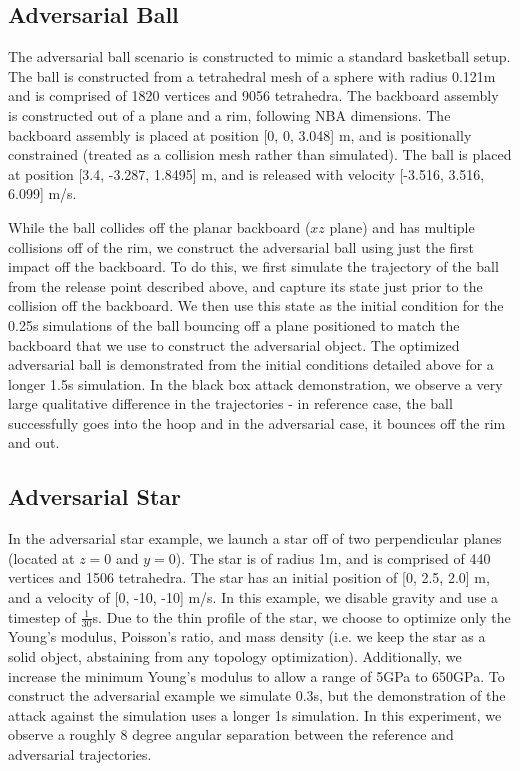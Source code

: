 \subsection{Adversarial Ball}
The adversarial ball scenario is constructed to mimic a standard basketball setup. The ball is constructed from a tetrahedral mesh of a sphere with radius 0.121m and is comprised of 1820 vertices and 9056 tetrahedra. The backboard assembly is constructed out of a plane and a rim, following NBA dimensions. The backboard assembly is placed at position [0, 0, 3.048] m, and is positionally constrained (treated as a collision mesh rather than simulated). The ball is placed at position  [3.4, -3.287, 1.8495] m, and is released with velocity [-3.516,  3.516,  6.099] m/s. 

While the ball collides off the planar backboard ($xz$ plane) and has multiple collisions off of the rim, we construct the adversarial ball using just the first impact off the backboard. To do this, we first simulate the trajectory of the ball from the release point described above, and capture its state just prior to the collision off the backboard. We then use this state as the initial condition for  the 0.25s simulations of the ball bouncing off a plane positioned to match the backboard that we use to construct the adversarial object. The optimized adversarial ball is demonstrated from the initial conditions detailed above for a longer 1.5s simulation. In the black box attack demonstration, we observe a very large qualitative difference in the trajectories - in reference case, the ball successfully goes into the hoop and in the adversarial case, it bounces off the rim and out.

\subsection{Adversarial Star}
In the adversarial star example, we launch a star off of two perpendicular planes (located at $z = 0$ and $y = 0$). The star is of radius 1m, and is comprised of 440 vertices and 1506 tetrahedra. The star has an initial position of [0, 2.5, 2.0] m, and a velocity of  [0, -10, -10] m/s. In this example, we disable gravity and use a timestep of $\frac{1}{30}$s. Due to the thin profile of the star, we choose to optimize only the Young's modulus, Poisson's ratio, and mass density (i.e. we keep the star as a solid object, abstaining from any topology optimization). Additionally, we increase the minimum Young's modulus to allow a range of 5GPa to 650GPa.
To construct the adversarial example we simulate 0.3s, but the demonstration of the attack against the simulation uses a longer 1s simulation. In this experiment, we observe a roughly 8 degree angular separation between the reference and adversarial trajectories.

